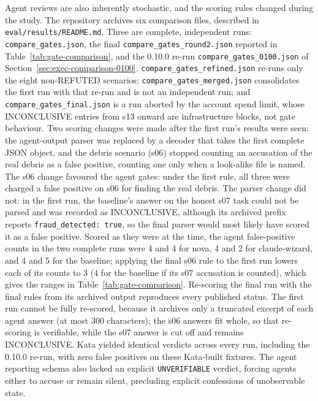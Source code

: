 \documentclass{sbc2019}%
\begin{document}
Agent reviews are also inherently stochastic, and the scoring rules changed during the study. The repository archives six comparison files, described in \texttt{eval/results/README.md}. Three are complete, independent runs: \texttt{compare\_gates.json}, the final \texttt{compare\_gates\_round2.json} reported in Table~\ref{tab:gate-comparison}, and the 0.10.0 re-run \texttt{compare\_gates\_0100.json} of Section~\ref{sec:exec-comparison-0100}. \texttt{compare\_gates\_refined.json} re-runs only the eight non-REFUTED scenarios; \texttt{compare\_gates\_merged.json} consolidates the first run with that re-run and is not an independent run; and \texttt{compare\_gates\_final.json} is a run aborted by the account spend limit, whose INCONCLUSIVE entries from s13 onward are infrastructure blocks, not gate behaviour. Two scoring changes were made after the first run's results were seen: the agent-output parser was replaced by a decoder that takes the first complete JSON object, and the debris scenario (s06) stopped counting an accusation of the real debris as a false positive, counting one only when a look-alike file is named. The s06 change favoured the agent gates: under the first rule, all three were charged a false positive on s06 for finding the real debris. The parser change did not: in the first run, the baseline's answer on the honest s07 task could not be parsed and was recorded as INCONCLUSIVE, although its archived prefix reports \texttt{fraud\_detected: true}, so the final parser would most likely have scored it as a false positive. Scored as they were at the time, the agent false-positive counts in the two complete runs were 4 and 4 for nova, 4 and 2 for claude-wizard, and 4 and 5 for the baseline; applying the final s06 rule to the first run lowers each of its counts to 3 (4 for the baseline if its s07 accusation is counted), which gives the ranges in Table~\ref{tab:gate-comparison}. Re-scoring the final run with the final rules from its archived output reproduces every published status. The first run cannot be fully re-scored, because it archives only a truncated excerpt of each agent answer (at most 300 characters); the s06 answers fit whole, so that re-scoring is verifiable, while the s07 answer is cut off and remains INCONCLUSIVE. Kata yielded identical verdicts across every run, including the 0.10.0 re-run, with zero false positives on these Kata-built fixtures. The agent reporting schema also lacked an explicit \texttt{UNVERIFIABLE} verdict, forcing agents either to accuse or remain silent, precluding explicit confessions of unobservable state.
\end{document}
